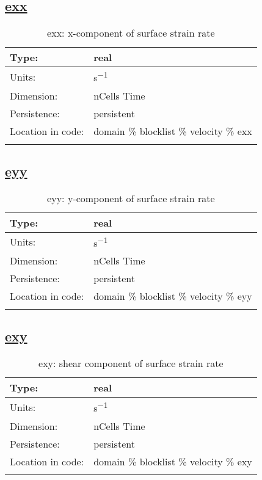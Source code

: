 \subsection[exx]{\hyperref[sec:var_tab_velocity]{exx}}
\label{subsec:var_sec_velocity_exx}
\begin{center}
\begin{longtable}{| p{2.0in} | p{4.0in} |}
        \hline 
        Type: & real \\
        \hline 
        Units: & \si{s^{-1}} \\
        \hline 
        Dimension: & nCells Time \\
        \hline 
        Persistence: & persistent \\
        \hline 
         Location in code: & domain \% blocklist \% velocity \% exx \\
         \hline 
    \caption{exx: x-component of surface strain rate}
\end{longtable}
\end{center}
\subsection[eyy]{\hyperref[sec:var_tab_velocity]{eyy}}
\label{subsec:var_sec_velocity_eyy}
\begin{center}
\begin{longtable}{| p{2.0in} | p{4.0in} |}
        \hline 
        Type: & real \\
        \hline 
        Units: & \si{s^{-1}} \\
        \hline 
        Dimension: & nCells Time \\
        \hline 
        Persistence: & persistent \\
        \hline 
         Location in code: & domain \% blocklist \% velocity \% eyy \\
         \hline 
    \caption{eyy: y-component of surface strain rate}
\end{longtable}
\end{center}
\subsection[exy]{\hyperref[sec:var_tab_velocity]{exy}}
\label{subsec:var_sec_velocity_exy}
\begin{center}
\begin{longtable}{| p{2.0in} | p{4.0in} |}
        \hline 
        Type: & real \\
        \hline 
        Units: & \si{s^{-1}} \\
        \hline 
        Dimension: & nCells Time \\
        \hline 
        Persistence: & persistent \\
        \hline 
         Location in code: & domain \% blocklist \% velocity \% exy \\
         \hline 
    \caption{exy: shear component of surface strain rate}
\end{longtable}
\end{center}
